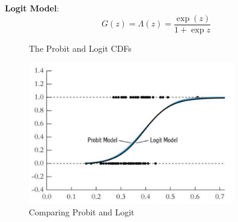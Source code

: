 \documentclass[11pt]{article}
\begin{document}
\begin{definition}
    \textbf{Logit Model}:
    \begin{equation}
        \label{logit}
        G(z) = \Lambda(z) = \dfrac{\exp(z)}{1+\exp{z}}
    \end{equation}
\end{definition}


\begin{figure}[h]
    \centering
    \qquad
    \caption{The Probit and Logit CDFs}%
    \label{fig:probit logit cdf}%
\end{figure}


\begin{figure}[h]
    \centering
    \includegraphics[width=9cm]{photos/logit vs probit.png}
    \caption{Comparing Probit and Logit}
    \label{fig: probit vs logit}
\end{figure}
\end{document}
